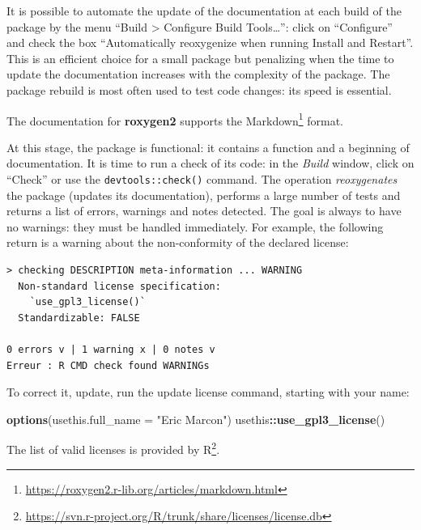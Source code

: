 \documentclass[
  12pt,
  american,
  a4paper,
  extrafontsizes,onecolumn,openright
  ]{memoir}
\newenvironment{Shaded}{\begin{snugshade}}{\end{snugshade}}
\newcommand{\AttributeTok}[1]{\textcolor[rgb]{0.13,0.29,0.53}{#1}}
\newcommand{\FunctionTok}[1]{\textcolor[rgb]{0.13,0.29,0.53}{\textbf{#1}}}
\newcommand{\NormalTok}[1]{#1}
\newcommand{\SpecialCharTok}[1]{\textcolor[rgb]{0.81,0.36,0.00}{\textbf{#1}}}
\newcommand{\StringTok}[1]{\textcolor[rgb]{0.31,0.60,0.02}{#1}}
\newlength{\rf}
\begin{document}
\normalsize

It is possible to automate the update of the documentation at each build of the package by the menu \enquote{Build \textgreater{} Configure Build Tools\ldots{}}: click on \enquote{Configure} and check the box \enquote{Automatically reoxygenize when running Install and Restart}.
This is an efficient choice for a small package but penalizing when the time to update the documentation increases with the complexity of the package. The package rebuild is most often used to test code changes: its speed is essential.

The documentation for \textbf{roxygen2} supports the Markdown\footnote{\url{https://roxygen2.r-lib.org/articles/markdown.html}} format.

At this stage, the package is functional: it contains a function and a beginning of documentation.
It is time to run a check of its code: in the \emph{Build} window, click on \enquote{Check} or use the \texttt{devtools::check()} command.
The operation \emph{reoxygenates} the package (updates its documentation), performs a large number of tests and returns a list of errors, warnings and notes detected.
The goal is always to have no warnings: they must be handled immediately.
For example, the following return is a warning about the non-conformity of the declared license:

\begin{verbatim}
> checking DESCRIPTION meta-information ... WARNING
  Non-standard license specification:
    `use_gpl3_license()`
  Standardizable: FALSE

0 errors v | 1 warning x | 0 notes v
Erreur : R CMD check found WARNINGs
\end{verbatim}

To correct it, update, run the update license command, starting with your name:

\scriptsize

\begin{Shaded}
\begin{Highlighting}[]
\FunctionTok{options}\NormalTok{(}\AttributeTok{usethis.full\_name =} \StringTok{"Eric Marcon"}\NormalTok{)}
\NormalTok{usethis}\SpecialCharTok{::}\FunctionTok{use\_gpl3\_license}\NormalTok{()}
\end{Highlighting}
\end{Shaded}

\normalsize

The list of valid licenses is provided by R\footnote{\url{https://svn.r-project.org/R/trunk/share/licenses/license.db}}.
\end{document}
